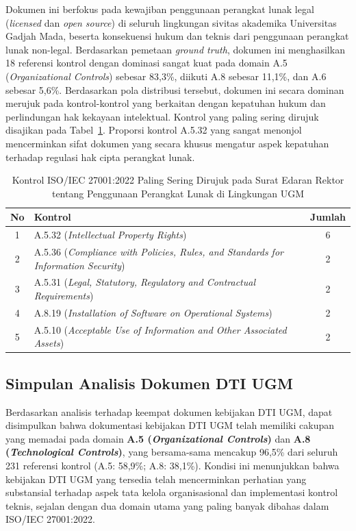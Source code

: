 Dokumen ini berfokus pada kewajiban penggunaan perangkat lunak legal (\textit{licensed} dan \textit{open source}) di seluruh lingkungan sivitas akademika Universitas Gadjah Mada, beserta konsekuensi hukum dan teknis dari penggunaan perangkat lunak non-legal. Berdasarkan pemetaan \textit{ground truth}, dokumen ini menghasilkan 18 referensi kontrol dengan dominasi sangat kuat pada domain A.5 (\textit{Organizational Controls}) sebesar 83,3\%, diikuti A.8 sebesar 11,1\%, dan A.6 sebesar 5,6\%. Berdasarkan pola distribusi tersebut, dokumen ini secara dominan merujuk pada kontrol-kontrol yang berkaitan dengan kepatuhan hukum dan perlindungan hak kekayaan intelektual. Kontrol yang paling sering dirujuk disajikan pada Tabel~\ref{tbl:top_ctrl_software}. Proporsi kontrol A.5.32 yang sangat menonjol mencerminkan sifat dokumen yang secara khusus mengatur aspek kepatuhan terhadap regulasi hak cipta perangkat lunak.

\begin{table}[H]
	\centering
	\caption{Kontrol ISO/IEC 27001:2022 Paling Sering Dirujuk pada Surat Edaran Rektor tentang Penggunaan Perangkat Lunak di Lingkungan UGM}
	\label{tbl:top_ctrl_software}
	\small
	\begin{tabular}{|c|>{\raggedright\arraybackslash}p{8.5cm}|c|}
		\hline
		\textbf{No} & \textbf{Kontrol} & \textbf{Jumlah} \\
		\hline
		1 & A.5.32 (\textit{Intellectual Property Rights}) & 6 \\
		\hline
		2 & A.5.36 (\textit{Compliance with Policies, Rules, and Standards for Information Security}) & 2 \\
		\hline
		3 & A.5.31 (\textit{Legal, Statutory, Regulatory and Contractual Requirements}) & 2 \\
		\hline
		4 & A.8.19 (\textit{Installation of Software on Operational Systems}) & 2 \\
		\hline
		5 & A.5.10 (\textit{Acceptable Use of Information and Other Associated Assets}) & 2 \\
		\hline
	\end{tabular}
\end{table}

\subsection{Simpulan Analisis Dokumen DTI UGM}

Berdasarkan analisis terhadap keempat dokumen kebijakan DTI UGM, dapat disimpulkan bahwa dokumentasi kebijakan DTI UGM telah memiliki cakupan yang memadai pada domain \textbf{A.5 (\textit{Organizational Controls})} dan \textbf{A.8 (\textit{Technological Controls})}, yang bersama-sama mencakup 96,5\% dari seluruh 231 referensi kontrol (A.5: 58,9\%; A.8: 38,1\%). Kondisi ini menunjukkan bahwa kebijakan DTI UGM yang tersedia telah mencerminkan perhatian yang substansial terhadap aspek tata kelola organisasional dan implementasi kontrol teknis, sejalan dengan dua domain utama yang paling banyak dibahas dalam ISO/IEC 27001:2022.

